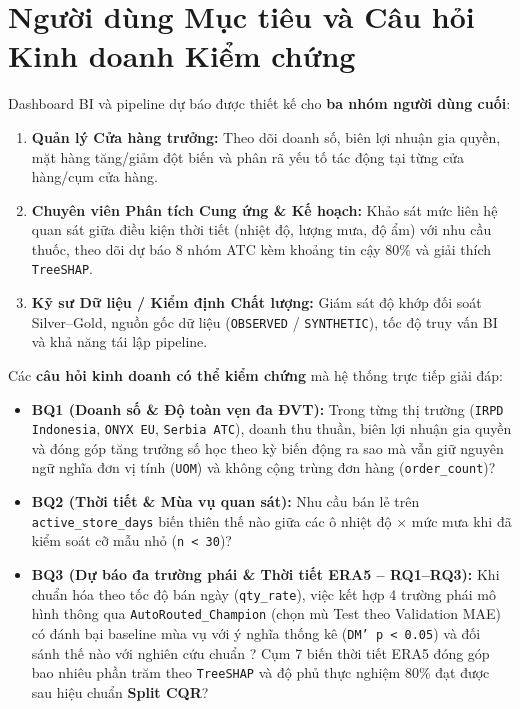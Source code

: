 \section{Người dùng Mục tiêu và Câu hỏi Kinh doanh Kiểm chứng}
Dashboard BI và pipeline dự báo được thiết kế cho \textbf{ba nhóm người dùng cuối}:
\begin{enumerate}[leftmargin=1.5em]
  \item \textbf{Quản lý Cửa hàng trưởng:} Theo dõi doanh số, biên lợi nhuận gia quyền, mặt hàng tăng/giảm đột biến và phân rã yếu tố tác động tại từng cửa hàng/cụm cửa hàng.
  \item \textbf{Chuyên viên Phân tích Cung ứng \& Kế hoạch:} Khảo sát mức liên hệ quan sát giữa điều kiện thời tiết (nhiệt độ, lượng mưa, độ ẩm) với nhu cầu thuốc, theo dõi dự báo 8 nhóm ATC kèm khoảng tin cậy 80\% và giải thích \texttt{TreeSHAP}.
  \item \textbf{Kỹ sư Dữ liệu / Kiểm định Chất lượng:} Giám sát độ khớp đối soát Silver--Gold, nguồn gốc dữ liệu (\texttt{OBSERVED} / \texttt{SYNTHETIC}), tốc độ truy vấn BI và khả năng tái lập pipeline.
\end{enumerate}

Các \textbf{câu hỏi kinh doanh có thể kiểm chứng} mà hệ thống trực tiếp giải đáp:
\begin{itemize}[leftmargin=1.5em]
  \item \textbf{BQ1 (Doanh số \& Độ toàn vẹn đa ĐVT):} Trong từng thị trường (\texttt{IRPD Indonesia}, \texttt{ONYX EU}, \texttt{Serbia ATC}), doanh thu thuần, biên lợi nhuận gia quyền và đóng góp tăng trưởng số học theo kỳ biến động ra sao mà vẫn giữ nguyên ngữ nghĩa đơn vị tính (\texttt{UOM}) và không cộng trùng đơn hàng (\texttt{order\_count})?
  \item \textbf{BQ2 (Thời tiết \& Mùa vụ quan sát):} Nhu cầu bán lẻ trên \texttt{active\_store\_days} biến thiên thế nào giữa các ô nhiệt độ $\times$ mức mưa khi đã kiểm soát cỡ mẫu nhỏ (\texttt{n < 30})?
  \item \textbf{BQ3 (Dự báo đa trường phái \& Thời tiết ERA5 -- RQ1--RQ3):} Khi chuẩn hóa theo tốc độ bán ngày (\texttt{qty\_rate}), việc kết hợp 4 trường phái mô hình thông qua \texttt{AutoRouted\_Champion} (chọn mù Test theo Validation MAE) có đánh bại baseline mùa vụ với ý nghĩa thống kê (\texttt{DM' p < 0.05}) và đối sánh thế nào với nghiên cứu chuẩn \cite{fourkiotis2024}? Cụm 7 biến thời tiết ERA5 đóng góp bao nhiêu phần trăm theo \texttt{TreeSHAP} và độ phủ thực nghiệm 80\% đạt được sau hiệu chuẩn \textbf{Split CQR}?
\end{itemize}

